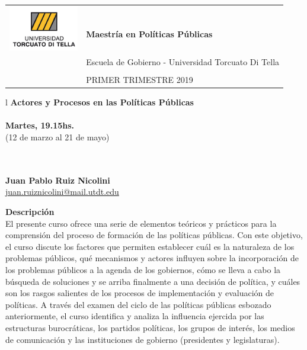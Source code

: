 \documentclass[11pt]{article}
\begin{document}
\begin{tabular}{ l l }
  \multirow{2}{*}{\includegraphics[height=.75in,width=1.2in]{utdt.png}}  
  \\
 & \textbf{\large Maestría en Políticas Públicas} 
  \\ 
  & Escuela de Gobierno - Universidad Torcuato Di Tella\\ \\ 
  & PRIMER TRIMESTRE 2019
  
\end{tabular}
\vspace{20mm}

\begin{tabular}{l}
\textbf{\LARGE Actores y Procesos en las Políticas Públicas}
 \\
  \\

\large\textbf{Martes, 19.15hs.}
 \\

\large{(12 de marzo al 21 de mayo)}
 
 \\
  \\
 \large \textbf{Juan Pablo Ruiz Nicolini}
 \\
 \large \href{mailto:juan.ruiznicolini@mail.utdt.edu}{juan.ruiznicolini@mail.utdt.edu}
\end{tabular}


\vspace{2cm}

\textbf {\large Descripción} \\ 

El presente curso ofrece una serie de elementos teóricos y prácticos para la comprensión del proceso de formación de las políticas públicas. Con este objetivo, el curso discute los factores que permiten establecer cuál es la naturaleza de los problemas públicos, qué mecanismos y actores influyen sobre la incorporación de los problemas públicos a la agenda de los gobiernos, cómo se lleva a cabo la búsqueda de soluciones y se arriba finalmente a una decisión de política, y cuáles son los rasgos salientes de los procesos de implementación y evaluación de políticas. A través del examen del ciclo de las políticas públicas esbozado anteriormente, el curso identifica y analiza la influencia ejercida por las estructuras burocráticas, los partidos políticas, los grupos de interés, los medios de comunicación y las instituciones de gobierno (presidentes y legislaturas). 
\end{document}

